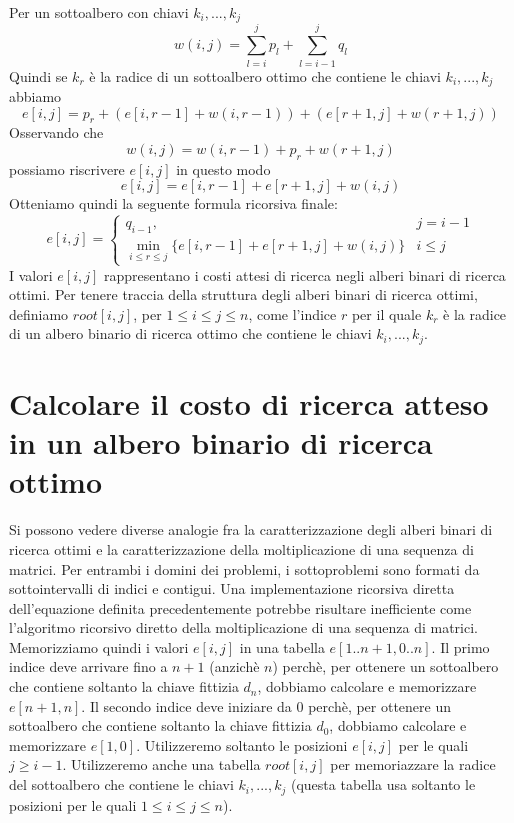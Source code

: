 Per un sottoalbero con chiavi $k_i, ..., k_j$
$$
  w(i , j) = \sum_{l = i}^{j} p_l + \sum_{l = i - 1}^{j} q_l
$$
Quindi se $k_r$ è la radice di un sottoalbero ottimo che contiene le
chiavi $k_i, ..., k_j$ abbiamo
$$
  e[i,j] = p_r + (e[i, r-1] + w(i, r-1)) + (e[r+1, j] + w(r+1, j))
$$
Osservando che
$$
  w(i,j) = w(i, r-1) + p_r + w(r+1, j)
$$
possiamo riscrivere $e[i,j]$ in questo modo
$$
  e[i,j] = e[i, r-1] + e[r+1, j] + w(i,j)
$$
Otteniamo quindi la seguente formula ricorsiva finale:
$$
  e[i,j] =
  \begin{cases}
    q_{i-1},                                                & j = i-1 \\
    \min_{i \le r \le j} \{e[i, r-1] + e[r+1, j] + w(i,j)\} & i \le j
  \end{cases}
$$
I valori $e[i,j]$ rappresentano i costi attesi di ricerca negli alberi
binari di ricerca ottimi. Per tenere traccia della struttura degli
alberi binari di ricerca ottimi, definiamo $root[i,j]$, per
$1 \le i \le j \le n$, come l'indice $r$ per il quale $k_r$ è la
radice di un albero binario di ricerca ottimo che contiene le chiavi
$k_i , ..., k_j$.

\section{Calcolare il costo di ricerca atteso in un albero binario di ricerca ottimo}

Si possono vedere diverse analogie fra la caratterizzazione degli alberi
binari di ricerca ottimi e la caratterizzazione della moltiplicazione di
una sequenza di matrici. Per entrambi i domini dei problemi, i
sottoproblemi sono formati da sottointervalli di indici e contigui. Una
implementazione ricorsiva diretta dell'equazione definita
precedentemente potrebbe risultare inefficiente come l'algoritmo
ricorsivo diretto della moltiplicazione di una sequenza di matrici.\\
Memorizziamo quindi i valori $e[i,j]$ in una tabella
$e[1..n +1, 0..n]$. Il primo indice deve arrivare fino a $n+1$
(anzichè $n$) perchè, per ottenere un sottoalbero che contiene
soltanto la chiave fittizia $d_n$, dobbiamo calcolare e memorizzare
$e[n+1,n]$. Il secondo indice deve iniziare da 0 perchè, per ottenere
un sottoalbero che contiene soltanto la chiave fittizia $d_0$,
dobbiamo calcolare e memorizzare $e[1,0]$. Utilizzeremo soltanto le
posizioni $e[i,j]$ per le quali $j \ge i-1$. Utilizzeremo anche una
tabella $root[i,j]$ per memoriazzare la radice del sottoalbero che
contiene le chiavi $k_i, ..., k_j$ (questa tabella usa soltanto le
posizioni per le quali $1 \le i \le j \le n$).\\

